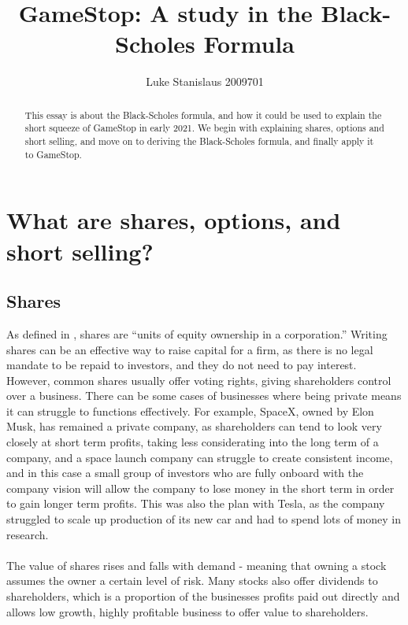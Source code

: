 \documentclass[11pt]{article} %
\title{GameStop: A study in the Black-Scholes Formula}
\author{Luke Stanislaus 2009701}
\begin{document}
\maketitle
\tableofcontents
\begin{abstract}
    This essay is about the Black-Scholes formula, and how it could be 
    used to explain the short squeeze of GameStop in early 2021. We begin 
    with explaining shares, options and short selling, and move on to 
    deriving the Black-Scholes formula, and finally apply it to GameStop.
    \end{abstract}



\section{What are shares, options, and short selling?}
\subsection{Shares}
As defined in \cite{shares}, shares are ``units of equity 
ownership in a corporation.'' Writing shares can be an effective way to raise 
capital for a firm, as there is no legal mandate to be repaid to 
investors, and they do not need to pay interest. However, common shares usually offer voting 
rights, giving shareholders control over a business. There can be some cases 
of businesses where being private means it can struggle to functions effectively.
For example, SpaceX, owned by Elon Musk, has remained a private company, as 
shareholders can tend to look very closely at short term profits, taking less 
considerating into the long term of a company, and a space launch company can 
struggle to create consistent income, and in this case a small group of investors 
who are fully onboard with the company vision will allow the company to lose 
money in the short term in order to gain longer term profits. This was also 
the plan with Tesla, as the company struggled to scale up production of its new 
car and had to spend lots of money in research. 
\paragraph{}
The value of 
shares rises and falls with demand - meaning that owning a stock assumes 
the owner a certain level of risk. Many stocks also offer dividends to 
shareholders, which is a proportion of the businesses profits paid out 
directly and allows low growth, highly profitable business to offer value 
to shareholders.
\end{document}
